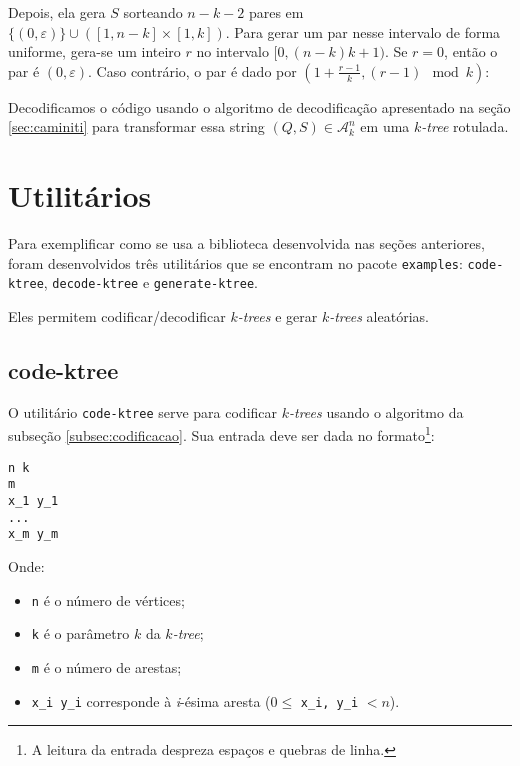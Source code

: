 

Depois, ela gera $S$ sorteando $n-k-2$ pares em $\{ ( 0, \varepsilon ) \} \cup ([1,n-k] \times [1,k])$. Para gerar um par nesse intervalo de forma uniforme, gera-se um inteiro $r$ no intervalo $[0, (n-k)k+1)$. Se $r = 0$, então o par é $(0, \varepsilon)$. Caso contrário, o par é dado por $\left(1 + \frac{r-1}{k}, (r-1) \mod k\right)$:



Decodificamos o código usando o algoritmo de decodificação apresentado na seção \ref{sec:caminiti} para transformar essa string $(Q, S) \in \mathcal{A}^n_k$ em uma \emph{$k$-tree} rotulada.

\section{Utilitários}

Para exemplificar como se usa a biblioteca desenvolvida nas seções anteriores, foram desenvolvidos três utilitários que se encontram no pacote {\tt examples}: {\tt code-ktree}, {\tt decode-ktree} e {\tt generate-ktree}.

Eles permitem codificar/decodificar \emph{$k$-trees} e gerar \emph{$k$-trees} aleatórias.

\subsection{code-ktree}

O utilitário {\tt code-ktree} serve para codificar \emph{$k$-trees} usando o algoritmo da subseção \ref{subsec:codificacao}. Sua entrada deve ser dada no formato\footnote{A leitura da entrada despreza espaços e quebras de linha.}:

\begin{lstlisting}
n k
m
x_1 y_1
...
x_m y_m
\end{lstlisting}

Onde:

\begin{itemize}
  \item {\tt n} é o número de vértices;
  \item {\tt k} é o parâmetro $k$ da \emph{$k$-tree};
  \item {\tt m} é o número de arestas;
  \item {\tt x\_i y\_i} corresponde à \emph{i}-ésima aresta ($0 \leq $ {\tt x\_i, y\_i} $ < n$).
\end{itemize}

